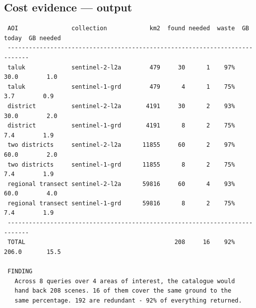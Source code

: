 \subsection{Cost evidence ---  output}

\begin{lstlisting}
 AOI               collection            km2  found needed  waste  GB today  GB needed
 ----------------------------------------------------------------------------
 taluk             sentinel-2-l2a        479     30      1    97%      30.0        1.0
 taluk             sentinel-1-grd        479      4      1    75%       3.7        0.9
 district          sentinel-2-l2a       4191     30      2    93%      30.0        2.0
 district          sentinel-1-grd       4191      8      2    75%       7.4        1.9
 two districts     sentinel-2-l2a      11855     60      2    97%      60.0        2.0
 two districts     sentinel-1-grd      11855      8      2    75%       7.4        1.9
 regional transect sentinel-2-l2a      59816     60      4    93%      60.0        4.0
 regional transect sentinel-1-grd      59816      8      2    75%       7.4        1.9
 ----------------------------------------------------------------------------
 TOTAL                                          208     16    92%     206.0       15.5

 FINDING
   Across 8 queries over 4 areas of interest, the catalogue would
   hand back 208 scenes. 16 of them cover the same ground to the
   same percentage. 192 are redundant - 92% of everything returned.
\end{lstlisting}
